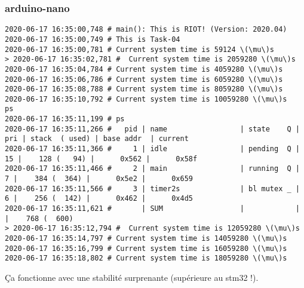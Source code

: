 \subsubsection{arduino-nano}
{\scriptsize
\begin{verbatim}
2020-06-17 16:35:00,748 # main(): This is RIOT! (Version: 2020.04)
2020-06-17 16:35:00,749 # This is Task-04
2020-06-17 16:35:00,781 # Current system time is 59124 \(\mu\)s
> 2020-06-17 16:35:02,781 #  Current system time is 2059280 \(\mu\)s
2020-06-17 16:35:04,784 # Current system time is 4059280 \(\mu\)s
2020-06-17 16:35:06,786 # Current system time is 6059280 \(\mu\)s
2020-06-17 16:35:08,788 # Current system time is 8059280 \(\mu\)s
2020-06-17 16:35:10,792 # Current system time is 10059280 \(\mu\)s
ps
2020-06-17 16:35:11,199 # ps
2020-06-17 16:35:11,266 # 	pid | name                 | state    Q | pri | stack  ( used) | base addr  | current     
2020-06-17 16:35:11,366 # 	  1 | idle                 | pending  Q |  15 |    128 (   94) |      0x562 |      0x58f 
2020-06-17 16:35:11,466 # 	  2 | main                 | running  Q |   7 |    384 (  364) |      0x5e2 |      0x659 
2020-06-17 16:35:11,566 # 	  3 | timer2s              | bl mutex _ |   6 |    256 (  142) |      0x462 |      0x4d5 
2020-06-17 16:35:11,621 # 	    | SUM                  |            |     |    768 (  600)
> 2020-06-17 16:35:12,794 #  Current system time is 12059280 \(\mu\)s
2020-06-17 16:35:14,797 # Current system time is 14059280 \(\mu\)s
2020-06-17 16:35:16,799 # Current system time is 16059280 \(\mu\)s
2020-06-17 16:35:18,802 # Current system time is 18059280 \(\mu\)s
\end{verbatim}
}
Ça fonctionne avec une stabilité surprenante (supérieure au stm32 !).
